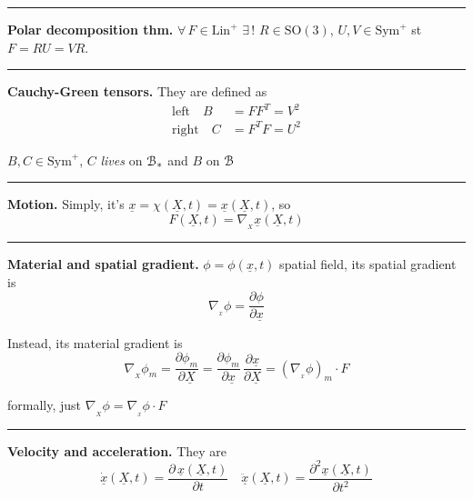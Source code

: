 \rule{0.31\textwidth}{0.2pt}
\smallskip

\textbf{Polar decomposition thm.} $\forall\,F\in\text{Lin}^+$ $\exists\,!$ $R\in\text{SO}(3)$, $U,V\in\!\text{Sym}^+$ st $F=RU=VR$.

\rule{0.31\textwidth}{0.2pt}
\smallskip

\textbf{Cauchy-Green tensors.} They are defined as
\begin{align*}
\text{left}\quad B&=FF^T=V^2 \\
\text{right}\quad C&=F^TF=U^2
\end{align*}

$B,C\in\text{Sym}^+$, $C$ \emph{lives} on $\EuScript{B}_*$ and $B$ on $\EuScript{B}$

\rule{0.31\textwidth}{0.2pt}
\smallskip

\textbf{Motion.} Simply, it's $\underline{x}=\chi(\underline{X},t)=\underline{x}(\underline{X},t)$, so
\begin{equation*}
F(\underline{X},t)=\nabla_{\!\! _X} \underline{x}(\underline{X},t)
\end{equation*}

\vspace{-1em}

\rule{0.31\textwidth}{0.2pt}
\smallskip

\textbf{Material and spatial gradient.} $\phi=\phi(\underline{x},t)$ spatial field, its spatial gradient is
\begin{equation*}
\nabla_{\!\!_x} \phi=\frac{\partial \phi}{\partial \underline{x}}
\end{equation*}

Instead, its material gradient is 
\begin{equation*}
\nabla_{\!\!_X} \phi_m=\frac{\partial \phi_m}{\partial \underline{X}}=\frac{\partial \phi_m}{\partial \underline{x}}\,\frac{\partial \underline{x}}{\partial \underline{X}}=\left( \nabla_{\!\!_x} \phi \right)_m \cdot F
\end{equation*}

formally, just $\boxed{\nabla_{\!\!_X} \phi=\nabla_{\!\!_x} \phi\cdot F}$

\rule{0.31\textwidth}{0.2pt}
\smallskip

\textbf{Velocity and acceleration.} They are
\begin{equation*}
\dot{\underline{x}}(\underline{X},t)=\frac{\partial\, \underline{x}(\underline{X},t)}{\partial t} \quad  \ddot{\underline{x}}(\underline{X},t)=\frac{\partial^2 \underline{x}(\underline{X},t)}{\partial t^2}
\end{equation*}

